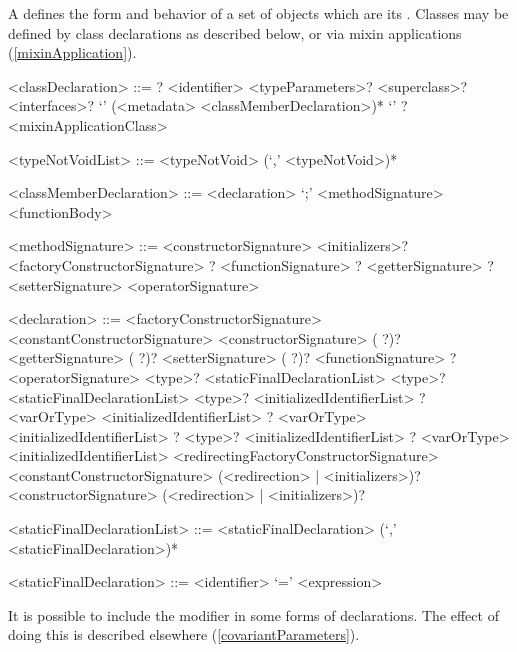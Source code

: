\documentclass[makeidx]{article}
\begin{document}
\LMHash{}%
A  defines the form and behavior of a set of objects which are its
.
Classes may be defined by class declarations as described below, or via mixin applications (\ref{mixinApplication}).

\begin{grammar}
<classDeclaration> ::=
  \ABSTRACT{}? \CLASS{} <identifier> <typeParameters>?
  \gnewline{} <superclass>? <interfaces>?
  \gnewline{} `{' (<metadata> <classMemberDeclaration>)* `}'
  \alt \ABSTRACT{}? \CLASS{} <mixinApplicationClass>

<typeNotVoidList> ::= <typeNotVoid> (`,' <typeNotVoid>)*

<classMemberDeclaration> ::= <declaration> `;'
  \alt <methodSignature> <functionBody>

<methodSignature> ::= <constructorSignature> <initializers>?
  \alt <factoryConstructorSignature>
  \alt \STATIC{}? <functionSignature>
  \alt \STATIC{}? <getterSignature>
  \alt \STATIC{}? <setterSignature>
  \alt <operatorSignature>

<declaration> ::= \EXTERNAL{} <factoryConstructorSignature>
  \alt \EXTERNAL{} <constantConstructorSignature>
  \alt \EXTERNAL{} <constructorSignature>
  \alt (\EXTERNAL{} \STATIC{}?)? <getterSignature>
  \alt (\EXTERNAL{} \STATIC{}?)? <setterSignature>
  \alt (\EXTERNAL{} \STATIC{}?)? <functionSignature>
  \alt \EXTERNAL{}? <operatorSignature>
  \alt \STATIC{} \CONST{} <type>? <staticFinalDeclarationList>
  \alt \STATIC{} \FINAL{} <type>? <staticFinalDeclarationList>
  \alt \STATIC{} \LATE{} \FINAL{} <type>? <initializedIdentifierList>
  \alt \STATIC{} \LATE{}? <varOrType> <initializedIdentifierList>
  \alt \COVARIANT{} \LATE{}? <varOrType> <initializedIdentifierList>
  \alt \LATE{}? \FINAL{} <type>? <initializedIdentifierList>
  \alt \LATE{}? <varOrType> <initializedIdentifierList>
  \alt <redirectingFactoryConstructorSignature>
  \alt <constantConstructorSignature> (<redirection> | <initializers>)?
  \alt <constructorSignature> (<redirection> | <initializers>)?

<staticFinalDeclarationList> ::= \gnewline{}
  <staticFinalDeclaration> (`,' <staticFinalDeclaration>)*

<staticFinalDeclaration> ::= <identifier> `=' <expression>
\end{grammar}

\LMHash{}%
It is possible to include the modifier \COVARIANT{} in some forms of declarations.
The effect of doing this is described elsewhere
(\ref{covariantParameters}).
\end{document}
